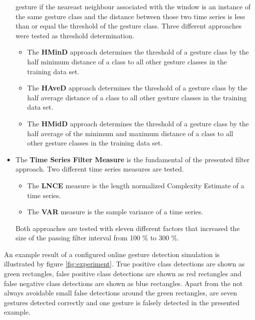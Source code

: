 \begin{itemize}
        gesture if the neareast neighbour associated with the window is an instance of the same gesture class and the
        distance between those two time series is less than or equal the threshold of the gesture class. Three different
        approaches were tested as threshold determination.
        \begin{itemize}
            \item The \textbf{HMinD} approach determines the threshold of a gesture class by the half minimum distance
                of a class to all other gesture classes in the training data set.
            \item The \textbf{HAveD} approach determines the threshold of a gesture class by the half average distance
                of a class to all other gesture classes in the training data set.
            \item The \textbf{HMidD} approach determines the threshold of a gesture class by the half average of the
                minimum and maximum distance of a class to all other gesture classes in the training data set.
        \end{itemize}
    \item The \textbf{Time Series Filter Measure} is the fundamental of the presented filter approach. Two different
        time series measures are tested.
        \begin{itemize}
            \item The \textbf{LNCE} measure is the length normalized Complexity Estimate of a time series.
            \item The \textbf{VAR} measure is the sample variance of a time series.
        \end{itemize}
        Both approaches are tested with eleven different factors that increased the size of the passing filter interval
        from 100 \% to 300 \%.
\end{itemize}

An example result of a configured online gesture detection simulation is illustrated by figure \ref{fig:experiment}.
True positive class detections are shown as green rectangles, false positive class detections are shown as red
rectangles and false negative class detections are shown as blue rectangles. Apart from the not always avoidable small
false detections around the green rectangles, are seven gestures detected correctly and one gesture is falsely detected
in the presented example.

